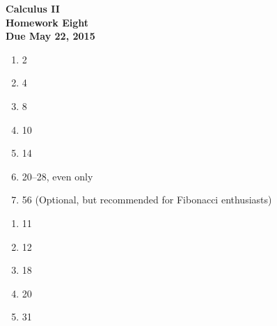\documentclass[12pt]{article}
\begin{document}
\pagestyle{empty}

\begin{center}
{\large {\bf Calculus II}}\\
\medskip
{\large {\bf Homework Eight}}\\
\medskip
{ {\bf Due May 22, 2015}}\\
\end{center}



\begin{enumerate}
\setlength{\itemsep}{-1mm}
\item 2
\item 4
\item 8
\item 10
\item 14
\item 20--28, even only
\item 56 (Optional, but recommended for Fibonacci enthusiasts)
\end{enumerate}




\begin{enumerate}
\setlength{\itemsep}{-1mm}
  \item 11
  \item 12
  \item 18
  \item 20
  \item 31
\end{enumerate}


%
%
\end{document}
